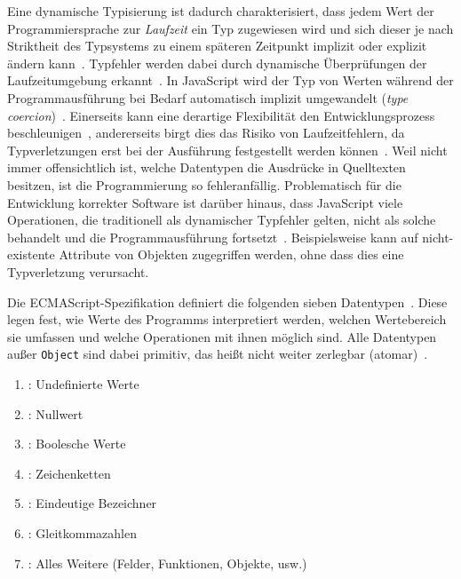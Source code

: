 Eine dynamische Typisierung ist dadurch charakterisiert, dass jedem Wert der Programmiersprache zur \emph{Laufzeit} ein Typ zugewiesen wird und sich dieser je nach Striktheit des Typsystems zu einem späteren Zeitpunkt implizit oder explizit ändern kann~\autocite[45]{WALDMANN:PPS}. Typfehler werden dabei durch dynamische Überprüfungen der Laufzeitumgebung erkannt~\autocite[37]{CARDELLI:TYPE_SYSTEMS}. In JavaScript wird der Typ von Werten während der Programmausführung bei Bedarf automatisch implizit umgewandelt (\emph{type coercion})~\autocite{RICHARDS:2010}. Einerseits kann eine derartige Flexibilität den Entwicklungsprozess beschleunigen~\autocite[1]{FLOW:PAPER}, andererseits birgt dies das Risiko von Laufzeitfehlern, da Typverletzungen erst bei der Ausführung festgestellt werden können~\autocite{ANDERSON:2005}. Weil nicht immer offensichtlich ist, welche Datentypen die Ausdrücke in Quelltexten besitzen, ist die Programmierung so fehleranfällig. Problematisch für die Entwicklung korrekter Software ist darüber hinaus, dass JavaScript viele Operationen, die traditionell als dynamischer Typfehler gelten, nicht als solche behandelt und die Programmausführung fortsetzt~\autocite{NIKHIL:2014}. Beispielsweise kann auf nicht-existente Attribute von Objekten zugegriffen werden, ohne dass dies eine Typverletzung verursacht.

Die ECMAScript-Spezifikation definiert die folgenden sieben Datentypen~\autocite[25]{ECMASCRIPT:2019}. Diese legen fest, wie Werte des Programms interpretiert werden, welchen Wertebereich sie umfassen und welche Operationen mit ihnen möglich sind. Alle Datentypen außer \texttt{Object} sind dabei primitiv, das heißt nicht weiter zerlegbar (atomar)~\autocite[8]{ECMASCRIPT:2019}.

\begin{enumerate}
  \item {}: Undefinierte Werte
  \item {}: Nullwert
  \item {}: Boolesche Werte
  \item {}: Zeichenketten
  \item {}: Eindeutige Bezeichner
  \item {}: Gleitkommazahlen
  \item {}: Alles Weitere (Felder, Funktionen, Objekte, usw.)
\end{enumerate}


